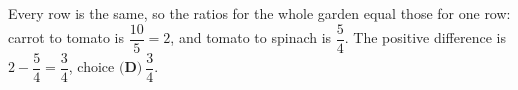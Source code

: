 Every row is the same, so the ratios for the whole garden equal those for one row: carrot to tomato is $\dfrac{10}{5}=2$, and tomato to spinach is $\dfrac54$. The positive difference is $2-\dfrac54=\dfrac34$, choice $\boxed{\textbf{(D)}\ \dfrac34}$.
